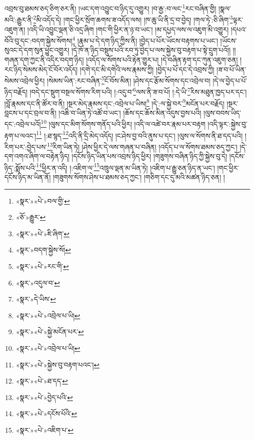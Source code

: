 འབྲས་བུ་ཐམས་ཅད་ཅིག་ཅར་ནི། །ཡང་དག་འབྱུང་བ་ཉིད་དུ་འགྱུར། །བ་རྒྱ་:བ་ལང་\footnote{«སྣར་»«པེ་»བལ་གྱི་}རང་བཞིན་གྱི། །སྣལ་མའི་:རྒྱུར་ནི་\footnote{«ཅོ་»རྒྱུར་}མི་འདོད་དེ། །གང་ཕྱིར་སྲོག་ཆགས་ཟ་འདོད་ལས། །ཁ་ཆུ་ཡི་ནི་དྲ་བ་བྱེད། །གལ་ཏེ་:ཅི་ཞིག་\footnote{«སྣར་»«པེ་»ཇི་ཞིག་}ལྟར་འཇུག་ན། །འདི་ཡི་འབྱུང་ལྡན་ཅི་འདྲ་ཞིག །གང་གི་ཕྱིར་ན་ཉ་བ་ཡང་། །མ་དཔྱད་ལས་ལ་འཇུག་མི་འགྱུར། །དཔའ་བོའི་བུ་དང་:བདག་སྐྱེས་སོགས།\footnote{«སྣར་»བདག་སྐྱེས་སོ།} །རྣམ་པ་དེ་དག་ཉིད་ཀྱིས་ནི། །བྱེད་པ་པོར་ཡོངས་བརྟགས་པ་ཡང་། །ཡོངས་སུའང་དེ་དག་སུན་ཕྱུང་འགྱུར། །དེ་ཁོ་ན་ཉིད་བསྡུས་པའི་རབ་ཏུ་བྱེད་པ་ལས་སྐྱེས་བུ་བརྟག་པ་སྟེ་དྲུག་པའོ།། །།གཞན་དག་ཀྱང་ནི་འདིར་བདག་ཉིད། །འདོད་ལ་སོགས་པའི་རྟེན་གྱུར་པ། །དེ་བཞིན་རྟག་དང་ཀུན་འཇུག་ཅན། །རང་ཉིད་སེམས་མེད་ངོ་བོར་འདོད། །དགེ་དང་མི་དགེའི་ལས་རྣམས་ཀྱི། །བྱེད་པ་པོ་དང་དེ་འབྲས་ཀྱི། །ཟ་བ་པོ་ཡིན་སེམས་འབྲེལ་ཕྱིར། །སེམས་ཡིན་:རང་བཞིན་\footnote{«སྣར་»«པེ་»རང་གི་}ངོ་བོས་མིན། །ཤེས་དང་རྩོམ་སོགས་དང་འབྲེལ་བ། །དེ་ལ་བྱེད་པ་པོ་ཉིད་བརྗོད། །བདེ་དང་སྡུག་བསྔལ་སོགས་རིག་པའི། །:འདུ་བ་\footnote{«སྣར་»འདུལ་བ་}ལས་ནི་ཟ་བ་པོ། །:དེ་ཡི་\footnote{«སྣར་»དེ་ཡིས་}རིས་མཐུན་ཁྱད་པར་དང་། །བློ་རྣམས་དང་ནི་ཚོར་བ་ནི། །སྔར་མེད་རྣམས་དང་:འབྲེལ་པ་ཡིས།\footnote{«སྣར་»«པེ་»འབྲེལ་པ་ཡི།} །དེ་:ལ་སྐྱེ་བར་\footnote{«སྣར་»«པེ་»སྐྱེ་མངོན་པར་}མངོན་པར་བརྗོད། །སྔར་བླངས་པ་དང་བྲལ་བ་ནི། །འཆི་བ་ཡིན་ཏེ་འཚོ་བ་ཡང་། །ཆོས་དང་ཆོས་མིན་འདུས་བྱས་པའི། །ལུས་བབས་ཡིད་དང་:འབྲེལ་པའོ།\footnote{«སྣར་»«པེ་»འབྲེལ་པ་ཡི།} །ལུས་དང་མིག་སོགས་གནོད་པའི་ཕྱིར། །འདི་ལ་འཚེ་བར་རྣམ་པར་བརྟག །འདི་ལྟར་:སྐྱེས་བུ་རྟག་པ་ལའང་།\footnote{«སྣར་»«པེ་»སྐྱེས་བུ་བརྟག་པའང་།} །:ཐ་སྙད་\footnote{«སྣར་»«པེ་»ཐ་དད་}འདི་ནི་དྲི་མེད་འདོད། །ང་ཤེས་བྱ་བའི་ནུས་པ་དང་། །ལུས་ལ་སོགས་ནི་ཐ་དད་པའི། །རིག་པར་:བྱེད་པས་\footnote{«སྣར་»«པེ་»བྱེད་པའི་}རིག་ཡིན་ཏེ། །ཤེས་ཕྱིར་དེ་ལས་གཞན་པ་བཞིན། །འདོད་པ་ལ་སོགས་ཐམས་ཅད་ཀྱང་། །དེ་དག་འགའ་ཞིག་ལ་བརྟེན་ཉིད། །དངོས་ཉིད་ཡིན་པས་འབྲས་ཉིད་ཕྱིར། །གཟུགས་བཞིན་ཉིད་ཀྱི་སྐྱེས་བུ་དེ། །དངོས་ཉིད་:སྨོས་པའི་\footnote{«སྣར་»«པེ་»དངོས་པོའི་}ཕྱིར་ན་འདི། །:འཇིག་ལ་\footnote{«སྣར་»«པེ་»འཇིག་པ་}འཁྲུལ་ལྡན་མ་ཡིན་ཏེ། །འཇིག་པ་རྒྱུ་ཅན་ཉིད་ན་ཡང་། །གང་ཕྱིར་དངོས་ཉིད་མ་ཡིན་ནོ། །གཟུགས་སོགས་ཤེས་པ་ཐམས་ཅད་ཀྱང་། །གཅིག་དང་དུ་མའི་མཚན་ཉིད་ཅན། །
